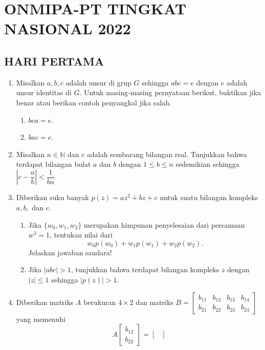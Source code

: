 \documentclass[12pt,twoside]{article}
\begin{document}
\section{ONMIPA-PT TINGKAT NASIONAL 2022}
\subsection{HARI PERTAMA}
\begin{enumerate}
    \item Misalkan $a,b,c$ adalah unsur di grup $G$ sehingga $abc=e$ dengan $e$ adalah unsur identitas di $G$. Untuk masing-masing pernyataan berikut, buktikan jika benar atau berikan contoh penyangkal jika salah.
          \begin{enumerate}
              \item $bca=e$.
              \item $bac=e$.
          \end{enumerate}
    \item Misalkan $n\in \mathbb{N}$ dan $c$ adalah sembarang bilangan real. Tunjukkan bahwa terdapat bilangan bulat $a$ dan $b$ dengan $1\leq b\leq n$ sedemikian sehingga $\left|c-\dfrac{a}{b}\right|<\dfrac{1}{bn}$.
    \item Diberikan suku banyak $p(z)=az^2+bz+c$ untuk suatu bilangan kompleks $a,b,$ dan $c$.
          \begin{enumerate}
              \item Jika $\{w_0,w_1,w_2\}$ merupakan himpunan penyelesaian dari persamaan $w^3=1$, tentukan nilai dari
                    $$ w_0p(w_0)+w_1p(w_1)+w_2p(w_2).$$
                    Jelaskan jawaban saudara!
              \item Jika $|abc|>1$, tunjukkan bahwa terdapat bilangan kompleks $z$ dengan $|z|\leq 1$ sehingga $|p(z)|>1$.
          \end{enumerate}
    \item Diberikan matriks $A$ berukuran $4\times 2$ dan matriks $B=\begin{bmatrix}
                  b_{11} & b_{12} & b_{13} & b_{14} \\
                  b_{21} & b_{22} & b_{23} & b_{24}
              \end{bmatrix} $ yang memenuhi
          $$ A\begin{bmatrix}
                  b_{12} \\ b_{22}
              \end{bmatrix} = \begin{bmatrix}

\end{bmatrix}$$
\end{enumerate}
\end{document}
